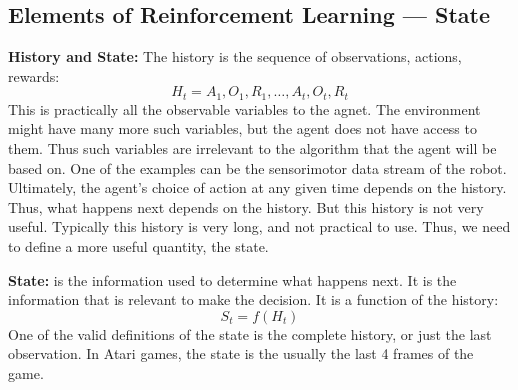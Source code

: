 \subsection{Elements of Reinforcement Learning --- State}
\textbf{History and State:}
The history is the sequence of observations, actions, rewards:
\[
    H_t = A_1, O_1, R_1, \dots, A_t, O_t, R_t  
\]
This is practically all the observable variables to the agnet. The environment might have many more
such variables, but the agent does not have access to them. Thus such variables are irrelevant to the
algorithm that the agent will be based on. One of the examples can be the sensorimotor data stream
of the robot.
Ultimately, the agent's choice of action at any given time depends on the history. Thus, what
happens next depends on the history. 
But this history is not very useful. Typically this history is very long, and not practical to
use. Thus, we need to define a more useful quantity, the state.

\textbf{State:} is the information used to determine what happens next. It is the information that is
relevant to make the decision. It is a function of the history:
\[
    S_t = f(H_t)
\]
One of the valid definitions of the state is the complete history, or just the last observation. 
In Atari games, the state is the usually the last 4 frames of the game.

